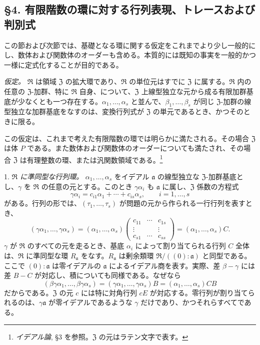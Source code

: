 \documentclass[11pt]{article}
\providecommand{\mR}{\mathfrak{R}}
\providecommand{\mZ}{\mathfrak{Z}}
\providecommand{\ma}{\mathfrak{a}}
\begin{document}
\subsection*{\S 4. 有限階数の環に対する行列表現、トレースおよび判別式}

この節および次節では、基礎となる環に関する仮定をこれまでより少し一般的にし、数体および関数体のオーダーも含める。本質的には既知の事実を一般的かつ一様に定式化することが目的である。

\emph{仮定。} $\mR$ は領域 $\mZ$ の拡大環であり、$\mR$ の単位元はすでに $\mZ$ に属する。$\mR$ 内の任意の $\mZ$-加群、特に $\mR$ 自身、について、$\mZ$ 上線型独立な元から成る有限加群基底が少なくとも一つ存在する。$\alpha_1,\ldots,\alpha_s$ と並んで、$\beta_1,\ldots,\beta_s$ が同じ $\mZ$-加群の線型独立な加群基底をなすのは、変換行列式が $\mZ$ の単元であるとき、かつそのときに限る。

この仮定は、これまで考えた有限階数の環では明らかに満たされる。その場合 $\mZ$ は体 $P$ である。また数体および関数体のオーダーについても満たされ、その場合 $\mZ$ は有理整数の環、または汎関数領域である。\footnote{\emph{イデアル論}, \S 3 を参照。$\mZ$ の元はラテン文字で表す。}

1. \emph{$\mR$ に準同型な行列環。} $\alpha_1,\ldots,\alpha_s$ をイデアル $\ma$ の線型独立な $\mZ$-加群基底とし、$\gamma$ を $\mR$ の任意の元とする。このとき $\gamma\alpha_i$ も $\ma$ に属し、$\mZ$ 係数の方程式
\[
        \gamma\alpha_i=c_{i1}\alpha_1+\cdots+c_{is}\alpha_s,
        \qquad i=1,\ldots,s
\]
がある。行列の形では、$(\tau_1,\ldots,\tau_s)$ が問題の元から作られる一行行列を表すとき、
\[
 (\gamma\alpha_1,\ldots,\gamma\alpha_s)
 = (\alpha_1,\ldots,\alpha_s)
   \begin{pmatrix}
      c_{11}&\cdots&c_{1s}\\
      \vdots&&\vdots\\
      c_{s1}&\cdots&c_{ss}
   \end{pmatrix}
 = (\alpha_1,\ldots,\alpha_s)C.
\]
$\gamma$ が $\mR$ のすべての元を走るとき、基底 $\alpha_i$ によって割り当てられる行列 $C$ 全体は、$\mR$ に準同型な環 $R_\ma$ をなす。$R_\ma$ は剰余類環 $\mR/((0):\ma)$ と同型である。ここで $(0):\ma$ は零イデアルの $\ma$ によるイデアル商を表す。実際、差 $\beta-\gamma$ には差 $B-C$ が対応し、積についても同様である。なぜなら
\[
(\beta\gamma\alpha_1,\ldots,\beta\gamma\alpha_s)
=(\gamma\alpha_1,\ldots,\gamma\alpha_s)B
=(\alpha_1,\ldots,\alpha_s)CB
\]
だからである。$\mZ$ の元 $c$ には特に対角行列 $cE$ が対応する。零行列が割り当てられるのは、$\gamma\ma$ が零イデアルであるような $\gamma$ だけであり、かつそれらすべてである。
\end{document}
